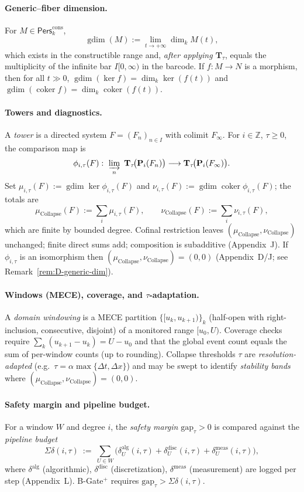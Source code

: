\documentclass[11pt]{article}
\DeclareMathOperator{\gdim}{gdim}
\DeclareRobustCommand{\hyp}{\nobreakdash-}
\newcommand{\Pers}{\mathsf{Pers}}
\numberwithin{equation}{section}
\theoremstyle{definition}
\DeclareRobustCommand{\Perskft}{\Pers^{\mathrm{cons}}_{k}}
\DeclareRobustCommand{\muc}{\mu_{\mathrm{Collapse}}}
\DeclareRobustCommand{\nuc}{\nu_{\mathrm{Collapse}}}
\begin{document}
\paragraph{Generic–fiber dimension.}
For \(M\in\Perskft\),
\[
\gdim(M):=\lim_{t\to+\infty}\dim_k M(t),
\]
which exists in the constructible range and, \emph{after applying \(\mathbf{T}_\tau\)}, equals the multiplicity of the infinite bar \(I[0,\infty)\) in the barcode.
If \(f:M\to N\) is a morphism, then for all \(t\gg0\),
\(\gdim(\ker f)=\dim_k\ker(f(t))\) and \(\gdim(\operatorname{coker} f)=\dim_k\operatorname{coker}(f(t))\).

\paragraph{Towers and diagnostics.}
A \emph{tower} is a directed system \(F=(F_n)_{n\in I}\) with colimit \(F_\infty\).
For \(i\in\mathbb{Z}\), \(\tau\ge 0\), the comparison map is
\[
\phi_{i,\tau}(F):\ \varinjlim_{n}\ \mathbf{T}_\tau\!\big(\mathbf{P}_i(F_n)\big)\longrightarrow \mathbf{T}_\tau\!\big(\mathbf{P}_i(F_\infty)\big).
\]
Set \(\mu_{i,\tau}(F):=\gdim\ker\phi_{i,\tau}(F)\) and \(\nu_{i,\tau}(F):=\gdim\operatorname{coker}\phi_{i,\tau}(F)\); the totals are
\[
\muc(F):=\sum_{i}\mu_{i,\tau}(F),\qquad \nuc(F):=\sum_{i}\nu_{i,\tau}(F),
\]
which are finite by bounded degree. Cofinal restriction leaves \((\muc,\nuc)\) unchanged; finite direct sums add; composition is subadditive (Appendix~J). If \(\phi_{i,\tau}\) is an isomorphism then \((\muc,\nuc)=(0,0)\) (Appendix~D/J; see Remark~\ref{rem:D-generic-dim}).

\paragraph{Windows (MECE), coverage, and \(\tau\)\hyp adaptation.}
A \emph{domain windowing} is a MECE partition \(\{[u_k,u_{k+1})\}_k\) (half\hyp open with right\hyp inclusion, consecutive, disjoint) of a monitored range \([u_0,U)\).
Coverage checks require \(\sum_k(u_{k+1}-u_k)=U-u_0\) and that the global event count equals the sum of per\hyp window counts (up to rounding).
Collapse thresholds \(\tau\) are \emph{resolution\hyp adapted} (e.g.\ \(\tau=\alpha\max\{\Delta t,\Delta x\}\)) and may be swept to identify \emph{stability bands} where \((\muc,\nuc)=(0,0)\).

\paragraph{Safety margin and pipeline budget.}
For a window \(W\) and degree \(i\), the \emph{safety margin} \(\mathrm{gap}_\tau>0\) is compared against the \emph{pipeline budget}
\[
\Sigma\delta(i,\tau)\ :=\ \sum_{U\in W}\Big(\delta_U^{\mathrm{alg}}(i,\tau)+\delta_U^{\mathrm{disc}}(i,\tau)+\delta_U^{\mathrm{meas}}(i,\tau)\Big),
\]
where \(\delta^{\mathrm{alg}}\) (algorithmic), \(\delta^{\mathrm{disc}}\) (discretization), \(\delta^{\mathrm{meas}}\) (measurement) are logged per step (Appendix~L). B\hyp Gate\(^{+}\) requires \(\mathrm{gap}_\tau>\Sigma\delta(i,\tau)\).
\end{document}
